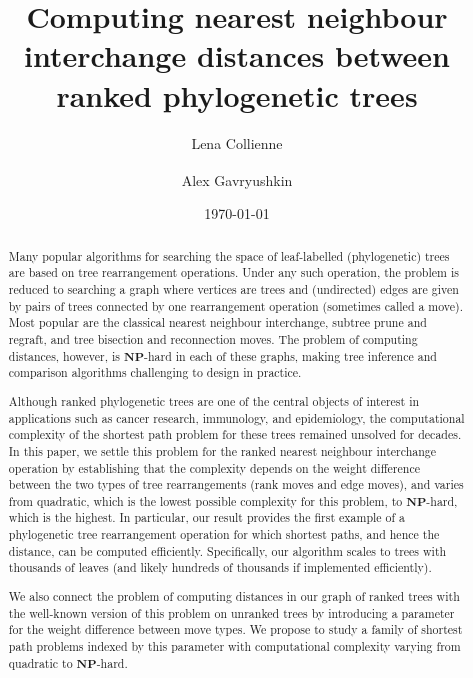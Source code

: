 \documentclass[11pt]{amsart}
\title[Computing $\rnni$ distance]{Computing nearest neighbour interchange distances between ranked phylogenetic trees}
\date{\today}
\author{Lena Collienne}
\author{Alex Gavryushkin\textsuperscript{\Letter}}
\newcommand{\np}{\mathbf{NP}}
\begin{document}
\begin{abstract}
Many popular algorithms for searching the space of leaf-labelled (phylogenetic) trees are based on tree rearrangement operations.
Under any such operation, the problem is reduced to searching a graph where vertices are trees and (undirected) edges are given by pairs of trees connected by one rearrangement operation (sometimes called a move).
Most popular are the classical nearest neighbour interchange, subtree prune and regraft, and tree bisection and reconnection moves.
The problem of computing distances, however, is $\np$-hard in each of these graphs, making tree inference and comparison algorithms challenging to design in practice.

Although ranked phylogenetic trees are one of the central objects of interest in applications such as cancer research, immunology, and epidemiology, the computational complexity of the shortest path problem for these trees remained unsolved for decades.
In this paper, we settle this problem for the ranked nearest neighbour interchange operation by establishing that the complexity depends on the weight difference between the two types of tree rearrangements (rank moves and edge moves), and varies from quadratic, which is the lowest possible complexity for this problem, to $\np$-hard, which is the highest.
In particular, our result provides the first example of a phylogenetic tree rearrangement operation for which shortest paths, and hence the distance, can be computed efficiently.
Specifically, our algorithm scales to trees with thousands of leaves (and likely hundreds of thousands if implemented efficiently).

We also connect the problem of computing distances in our graph of ranked trees with the well-known version of this problem on unranked trees by introducing a parameter for the weight difference between move types.
We propose to study a family of shortest path problems indexed by this parameter with computational complexity varying from quadratic to $\np$-hard.
\end{abstract}


\maketitle
\end{document}
